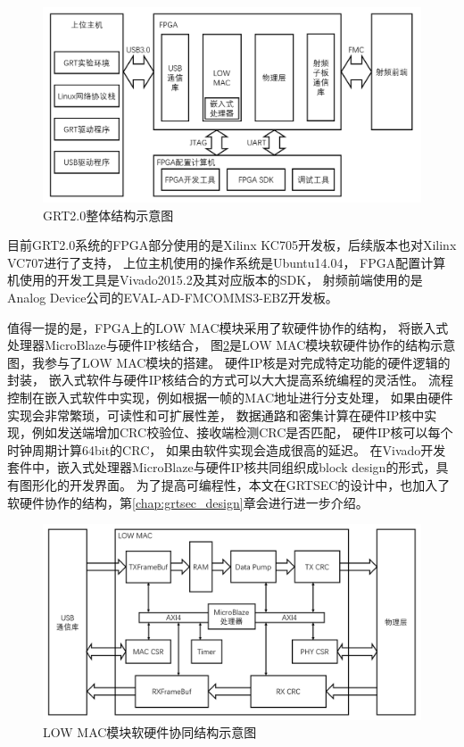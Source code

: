 		\begin{figure}
			\centering
			\includegraphics[width=1.0\textwidth]{img/GRT_overview.png}
			\caption{GRT2.0整体结构示意图}
			\label{fig:grt_overview}
		\end{figure}
	目前GRT2.0系统的FPGA部分使用的是Xilinx KC705开发板，后续版本也对Xilinx VC707进行了支持，
	上位主机使用的操作系统是Ubuntu14.04，
	FPGA配置计算机使用的开发工具是Vivado2015.2及其对应版本的SDK，
	射频前端使用的是Analog Device公司的EVAL-AD-FMCOMMS3-EBZ开发板\cite{fmcomms3}。

	值得一提的是，FPGA上的LOW MAC模块采用了软硬件协作的结构，
	将嵌入式处理器MicroBlaze\cite{microblaze}与硬件IP核\cite{xilinxip}结合，
	图\ref{fig:grt_lowmac}是LOW MAC模块软硬件协作的结构示意图，我参与了LOW MAC模块的搭建。
	硬件IP核是对完成特定功能的硬件逻辑的封装，
	嵌入式软件与硬件IP核结合的方式可以大大提高系统编程的灵活性。
	流程控制在嵌入式软件中实现，例如根据一帧的MAC地址进行分支处理，
	如果由硬件实现会非常繁琐，可读性和可扩展性差，
	数据通路和密集计算在硬件IP核中实现，例如发送端增加CRC校验位、接收端检测CRC是否匹配，
	硬件IP核可以每个时钟周期计算64bit的CRC，
	如果由软件实现会造成很高的延迟。
	在Vivado开发套件中，嵌入式处理器MicroBlaze与硬件IP核共同组织成block design\cite{xilinxblockdesign}的形式，具有图形化的开发界面。
	为了提高可编程性，本文在GRTSEC的设计中，也加入了软硬件协作的结构，第\ref{chap:grtsec_design}章会进行进一步介绍。

		\begin{figure}
			\centering
			\includegraphics[width=1.0\textwidth]{img/GRT_lowmac.png}
			\caption{LOW MAC模块软硬件协同结构示意图}
			\label{fig:grt_lowmac}
		\end{figure}

